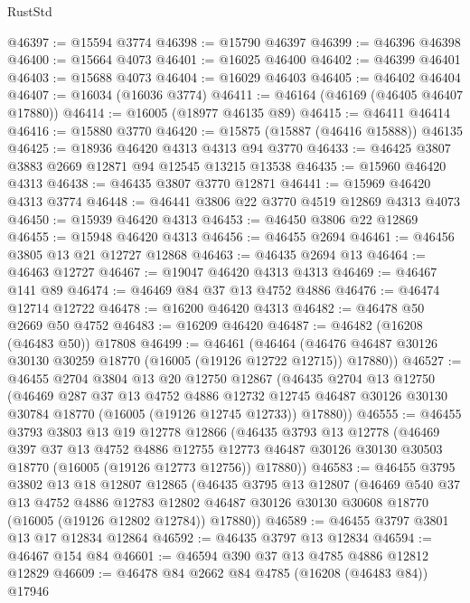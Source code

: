 \begin{lexlean}{RustStd}
\begin{coremodule}
@46397 := @15594 @3774
@46398 := @15790 @46397
@46399 := @46396 @46398
@46400 := @15664 @4073
@46401 := @16025 @46400
@46402 := @46399 @46401
@46403 := @15688 @4073
@46404 := @16029 @46403
@46405 := @46402 @46404
@46407 := @16034 (@16036 @3774)
@46411 := @46164 (@46169 (@46405 @46407 @17880))
@46414 := @16005 (@18977 @46135 @89)
@46415 := @46411 @46414
@46416 := @15880 @3770
@46420 := @15875 (@15887 (@46416 @15888)) @46135
@46425 := @18936 @46420 @4313 @4313 @94 @3770
@46433 := @46425 @3807 @3883 @2669 @12871 @94 @12545 @13215 @13538
@46435 := @15960 @46420 @4313
@46438 := @46435 @3807 @3770 @12871
@46441 := @15969 @46420 @4313 @3774
@46448 := @46441 @3806 @22 @3770 @4519 @12869 @4313 @4073
@46450 := @15939 @46420 @4313
@46453 := @46450 @3806 @22 @12869
@46455 := @15948 @46420 @4313
@46456 := @46455 @2694
@46461 := @46456 @3805 @13 @21 @12727 @12868
@46463 := @46435 @2694 @13
@46464 := @46463 @12727
@46467 := @19047 @46420 @4313 @4313
@46469 := @46467 @141 @89
@46474 := @46469 @84 @37 @13 @4752 @4886
@46476 := @46474 @12714 @12722
@46478 := @16200 @46420 @4313
@46482 := @46478 @50 @2669 @50 @4752
@46483 := @16209 @46420
@46487 := @46482 (@16208 (@46483 @50)) @17808
@46499 := @46461
    (@46464 (@46476 @46487 @30126 @30130 @30259 @18770 (@16005 (@19126 @12722 @12715)) @17880))
@46527 := @46455
    @2704
    @3804
    @13
    @20
    @12750
    @12867
    (@46435
      @2704
      @13
      @12750
      (@46469
        @287
        @37
        @13
        @4752
        @4886
        @12732
        @12745
        @46487
        @30126
        @30130
        @30784
        @18770
        (@16005 (@19126 @12745 @12733))
        @17880))
@46555 := @46455
    @3793
    @3803
    @13
    @19
    @12778
    @12866
    (@46435
      @3793
      @13
      @12778
      (@46469
        @397
        @37
        @13
        @4752
        @4886
        @12755
        @12773
        @46487
        @30126
        @30130
        @30503
        @18770
        (@16005 (@19126 @12773 @12756))
        @17880))
@46583 := @46455
    @3795
    @3802
    @13
    @18
    @12807
    @12865
    (@46435
      @3795
      @13
      @12807
      (@46469
        @540
        @37
        @13
        @4752
        @4886
        @12783
        @12802
        @46487
        @30126
        @30130
        @30608
        @18770
        (@16005 (@19126 @12802 @12784))
        @17880))
@46589 := @46455 @3797 @3801 @13 @17 @12834 @12864
@46592 := @46435 @3797 @13 @12834
@46594 := @46467 @154 @84
@46601 := @46594 @390 @37 @13 @4785 @4886 @12812 @12829
@46609 := @46478 @84 @2662 @84 @4785 (@16208 (@46483 @84)) @17946

\end{coremodule}
\end{lexlean}

